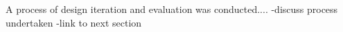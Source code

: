 A process of design iteration and evaluation was conducted....
-discuss process undertaken
-link to next section











